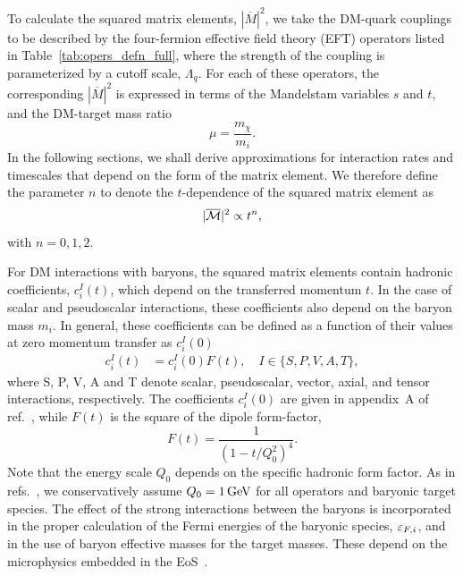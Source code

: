 To calculate the squared matrix elements, $|\overline{M}|^2$, we take the DM-quark couplings to be described by the four-fermion effective field theory (EFT) operators listed in Table~\ref{tab:opers_defn_full}, where the strength of the coupling is parameterized by a cutoff scale, $\Lambda_q$. For each of these operators, the corresponding $|\overline{M}|^2$ is expressed in terms of the Mandelstam variables $s$ and $t$, and the DM-target mass ratio 
\begin{equation}
  \mu=\frac{m_\chi}{m_i}.
\end{equation}
In the following sections, we shall derive approximations for interaction rates and timescales that depend on the form of the matrix element. We therefore define the parameter $n$ to denote the $t$-dependence of  the squared matrix element as 
\begin{equation}
|\overline{\mathcal M}|^2 \propto t^n, 
\label{eq:ndef}
\end{equation}
with $n=0,1,2$. 

For DM interactions with baryons, the squared matrix elements contain hadronic coefficients, $c_i^I(t)$, which depend on the transferred momentum $t$. In the case of scalar and pseudoscalar interactions, these coefficients also depend on the baryon mass $m_i$. 
In general, these coefficients can be defined as a function of their values at zero momentum transfer as $c_i^I(0)$~\cite{Thomas:2001kw_Structurenucleon}
\begin{eqnarray}
c_i^I(t) &= c_i^I(0) F(t),\quad I\in\{S,P,V,A,T\},\label{eq:tdep}
\end{eqnarray}
where S, P, V, A and T denote scalar, pseudoscalar, vector, axial, and tensor interactions, respectively. The coefficients $c_i^I(0)$  are given in appendix~A of ref.~\cite{Anzuini:2021lnv_nov_Improvedtreatmentdark}, while $F(t)$ is the square of the dipole form-factor,
%
\begin{equation}
    F(t) = \frac{1}{(1-t/Q_0^2)^4}. 
    \label{eq:formfactor}
  \end{equation}
%
Note that the energy scale $Q_0$ depends on the specific hadronic form factor. As in refs.~\cite{Bell:2020obw_sep_NucleonStructureStrong,Anzuini:2021lnv_nov_Improvedtreatmentdark}, we conservatively assume $Q_0=1{\rm \,GeV}$ for all operators and baryonic target species. 
%
The effect of the strong interactions between the baryons is incorporated in the proper calculation of the Fermi energies of the baryonic species, $\varepsilon_{F,i}$, and in the use of baryon effective masses for the target masses. These depend on the microphysics embedded in the EoS~\cite{Bell:2020jou_sep_ImprovedTreatmentDark,Anzuini:2021lnv_nov_Improvedtreatmentdark}. 



